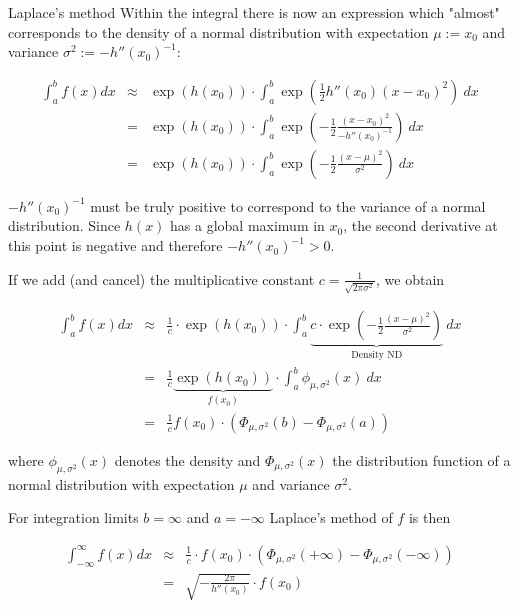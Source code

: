 \documentclass[11pt,compress,t,notes=noshow, xcolor=table]{beamer}
\begin{document}
\begin{vbframe}{Laplace's method}
Within the integral there is now an expression which "almost" corresponds to the density of a normal distribution with expectation $\mu := x_0$ and variance $\sigma^2 := -h''(x_0)^{-1}$:

\vspace{-0.3cm}

\begin{eqnarray*}
\int_a^b f(x) dx &\approx& \exp\left( h(x_0)\right) \cdot\int_a^b  \exp\left(\frac{1}{2} h''(x_0)(x - x_0)^2\right)~dx \\
&=& \exp\left( h(x_0)\right) \cdot\int_a^b  \exp\left(-\frac{1}{2} \frac{(x - x_0)^2}{-h''(x_0)^{-1}}\right) ~dx\\
&=& \exp\left( h(x_0)\right) \cdot\int_a^b  \exp\left(-\frac{1}{2} \frac{(x - \mu)^2}{\sigma^2}\right)~dx
\end{eqnarray*}

\vfill

\begin{footnotesize}
$-h''(x_0)^{-1}$ must be truly positive to correspond to the variance of a normal distribution. Since $h(x)$ has a global maximum in $x_0$, the second derivative at this point is negative and therefore $-h''(x_0)^{-1} > 0$.
\end{footnotesize}

\framebreak

If we add (and cancel) the multiplicative constant $c = \frac{1}{\sqrt{2\pi\sigma^2}}$, we obtain

\begin{eqnarray*}
\int_a^b f(x) dx &\approx& \frac{1}{c} \cdot \exp\left( h(x_0)\right) \cdot\int_a^b \underbrace{c \cdot \exp\left(-\frac{1}{2} \frac{(x - \mu)^2}{\sigma^2}\right)}_{\text{Density ND}}~dx\\
&=& \frac{1}{c}\underbrace{\exp\left( h(x_0)\right)}_{f(x_0)} \cdot \int_a^b \phi_{\mu, \sigma^2} (x)~dx \\
&=& \frac{1}{c}f(x_0) \cdot \left(\Phi_{\mu, \sigma^2}(b) - \Phi_{\mu, \sigma^2}(a)\right)
\end{eqnarray*}

where $\phi_{\mu, \sigma^2}(x)$ denotes the density and $\Phi_{\mu, \sigma^2}(x)$ the distribution function of a normal distribution with expectation $\mu$ and variance $\sigma^2$.

\framebreak

For integration limits $b = \infty$ and $a = -\infty$ Laplace's method of $f$ is then

\begin{eqnarray*}
\int_{-\infty}^{\infty} f(x) dx &\approx& \frac{1}{c}\cdot f(x_0) \cdot \left(\Phi_{\mu, \sigma^2}(+ \infty) - \Phi_{\mu, \sigma^2}(-\infty)\right) \\
&=& \sqrt{- \frac{2\pi}{h''(x_0)}} \cdot f(x_0)
\end{eqnarray*}


\end{vbframe}
\end{document}
